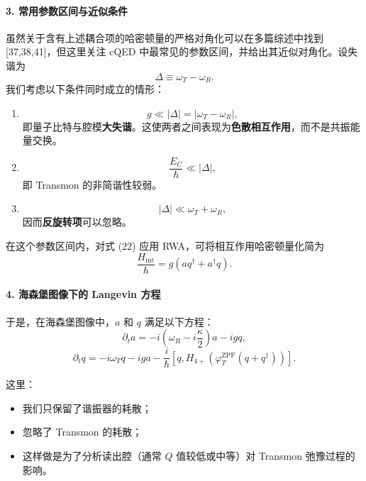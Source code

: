 \documentclass[12pt,a4paper,oneside]{ctexbook}
\begin{document}
\paragraph{3. 常用参数区间与近似条件}

虽然关于含有上述耦合项的哈密顿量的严格对角化可以在多篇综述中找到 [37,38,41]，但这里关注 cQED 中最常见的参数区间，并给出其近似对角化。设失谐为
\[
    \Delta\equiv \omega_T-\omega_R.
\]
我们考虑以下条件同时成立的情形：

\begin{enumerate}[leftmargin=2em]
    \item
    \[
        g\ll |\Delta|=|\omega_T-\omega_R|,
    \]
    即量子比特与腔模\textbf{大失谐}。这使两者之间表现为\textbf{色散相互作用}，而不是共振能量交换。

    \item
    \[
        \frac{E_C}{\hbar}\ll |\Delta|,
    \]
    即 Transmon 的非简谐性较弱。

    \item
    \[
        |\Delta|\ll \omega_T+\omega_R,
    \]
    因而\textbf{反旋转项}可以忽略。
\end{enumerate}

在这个参数区间内，对式 (22) 应用 RWA，可将相互作用哈密顿量化简为
\[
    \frac{H_{\mathrm{int}}}{\hbar}
    =
    g(aq^\dagger+a^\dagger q).
\]

\paragraph{4. 海森堡图像下的 Langevin 方程}

于是，在海森堡图像中，\(a\) 和 \(q\) 满足以下方程：
\begin{equation}
    \partial_t a
    =
    -i\left(\omega_R-i\frac{\kappa}{2}\right)a
    -igq,
    \tag{23}
\end{equation}
\begin{equation}
    \partial_t q
    =
    -i\omega_T q
    -iga
    -\frac{i}{\hbar}
    \left[
        q,
        H_{4+}\!\left(\varphi_T^{\mathrm{ZPF}}(q+q^\dagger)\right)
    \right].
    \tag{24}
\end{equation}

这里：
\begin{itemize}[leftmargin=2em]
    \item 我们只保留了谐振器的耗散；
    \item 忽略了 Transmon 的耗散；
    \item 这样做是为了分析读出腔（通常 \(Q\) 值较低或中等）对 Transmon 弛豫过程的影响。
\end{itemize}
\end{document}
